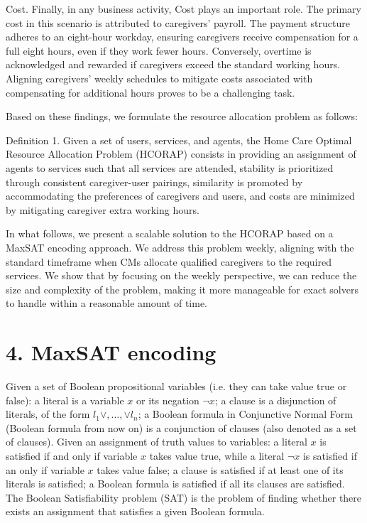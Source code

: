 \documentclass[10pt]{article}
\begin{document}
Cost. Finally, in any business activity, Cost plays an important role. The primary cost in this scenario is attributed to caregivers' payroll. The payment structure adheres to an eight-hour workday, ensuring caregivers receive compensation for a full eight hours, even if they work fewer hours. Conversely, overtime is acknowledged and rewarded if caregivers exceed the standard working hours. Aligning caregivers' weekly schedules to mitigate costs associated with compensating for additional hours proves to be a challenging task.

Based on these findings, we formulate the resource allocation problem as follows:

Definition 1. Given a set of users, services, and agents, the Home Care Optimal Resource Allocation Problem (HCORAP) consists in providing an assignment of agents to services such that all services are attended, stability is prioritized through consistent caregiver-user pairings, similarity is promoted by accommodating the preferences of caregivers and users, and costs are minimized by mitigating caregiver extra working hours.

In what follows, we present a scalable solution to the HCORAP based on a MaxSAT encoding approach. We address this problem weekly, aligning with the standard timeframe when CMs allocate qualified caregivers to the required services. We show that by focusing on the weekly perspective, we can reduce the size and complexity of the problem, making it more manageable for exact solvers to handle within a reasonable amount of time.

\section*{4. MaxSAT encoding}
Given a set of Boolean propositional variables (i.e. they can take value true or false): a literal is a variable $x$ or its negation $\neg x$; a clause is a disjunction of literals, of the form $l_{1} \vee, \ldots, \vee l_{n}$; a Boolean formula in Conjunctive Normal Form (Boolean formula from now on) is a conjunction of clauses (also denoted as a set of clauses). Given an assignment of truth values to variables: a literal $x$ is satisfied if and only if variable $x$ takes value true, while a literal $\neg x$ is satisfied if an only if variable $x$ takes value false; a clause is satisfied if at least one of its literals is satisfied; a Boolean formula is satisfied if all its clauses are satisfied. The Boolean Satisfiability problem (SAT) is the problem of finding whether there exists an assignment that satisfies a given Boolean formula.
\end{document}
